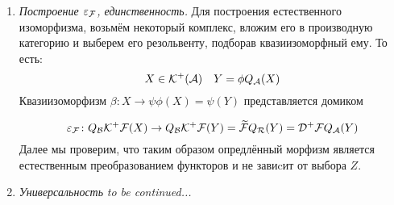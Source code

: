 \documentclass[../main.tex]{subfiles}
\begin{document}
\begin{enumerate}
\begin{proof}
    $\Rightarrow$ $\DlF{F}$ -- точный.
\end{proof}
     \item \textit{Построение $\varepsilon_{\mathcal{F}}$, единственность.}
     Для построения естественного изоморфизма, возьмём некоторый комплекс, вложим его в производную категорию и выберем его резольвенту, подборав квазиизоморфный ему. То есть:
     \[
     X \in \mathcal{K^+(A)} \quad Y = \phi Q_{\mathcal{A}} (X)
     \]
     Квазиизоморфизм $\beta \colon X \to \psi\phi(X) = \psi(Y)$ представляется домиком
     \bee
{}
\overset{\KlF{\F}}{\longrightarrow}
     \eee
     \[\varepsilon_{\mathcal{F}} \colon Q_{\mathcal{B}}\mathcal{K^+ \mathcal{F}}(X) \to Q_{\mathcal{B}}\mathcal{K^+ \mathcal{F}}(Y) = \widetilde{\mathcal{F}}Q_{\mathcal{R}}(Y) = \mathcal{D^+ \mathcal{F}}Q_{\mathcal{A}}(Y)\]
     Далее мы проверим, что таким образом опредлённый морфизм является естественным преобразованием функторов и не завиcит от выбора $Z$.
     \item \textit{Универсальность} \textit{to be continued...}\label{natural}
\end{enumerate}
\bee
{}
\eee
\bee
{}
\end{document}
